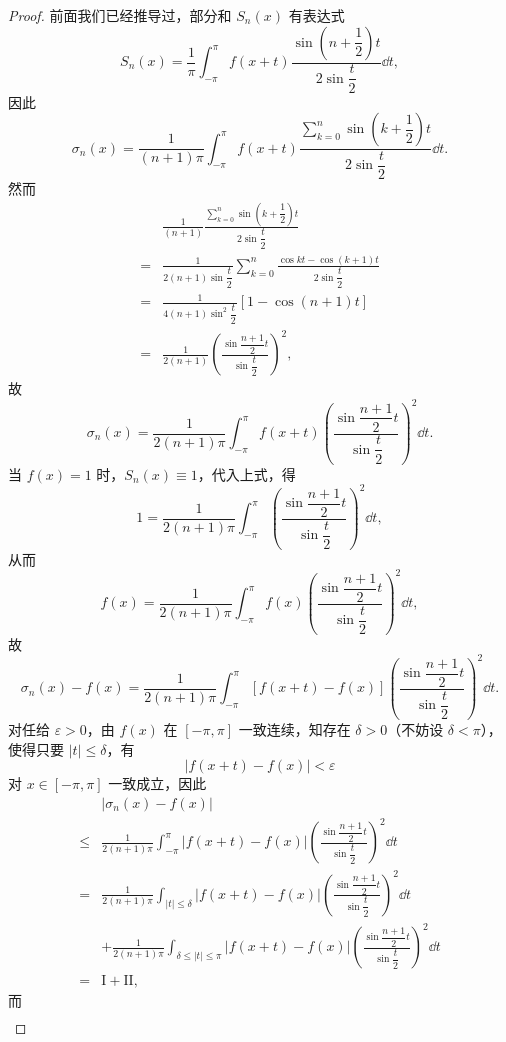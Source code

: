 \begin{proof}
前面我们已经推导过，部分和 $S_{n}(x)$ 有表达式
\[
S_{n}(x)=\frac{1}{\pi}\int_{-\pi}^{\pi}f(x+t)\frac{\sin\left(n+\dfrac{1}{2}\right)t}{2\sin\dfrac{t}{2}}\dd t,
\]
因此
\[
\sigma_{n}(x)=\frac{1}{(n+1)\pi}\int_{-\pi}^{\pi}f(x+t)\frac{\displaystyle\sum_{k=0}^{n}\sin\left(k+\dfrac{1}{2}\right)t}{2\sin\dfrac{t}{2}}\dd t.
\]
然而
\[
\begin{aligned}
&\frac{1}{(n+1)}\frac{\displaystyle\sum_{k=0}^{n}\sin\left(k+\dfrac{1}{2}\right)t}{2\sin\dfrac{t}{2}}\\
={}&\frac{1}{2(n+1)\sin\dfrac{t}{2}}\sum_{k=0}^{n}\frac{\cos kt-\cos(k+1)t}{2\sin\dfrac{t}{2}}\\
={}&\frac{1}{4(n+1)\sin^{2}\dfrac{t}{2}}\left[1-\cos(n+1)t\right]\\
={}&\frac{1}{2(n+1)}\left(\frac{\sin\dfrac{n+1}{2}t}{\sin\dfrac{t}{2}}\right)^{2},
\end{aligned}
\]
故
\[
\sigma_{n}(x)=\frac{1}{2(n+1)\pi}\int_{-\pi}^{\pi}f(x+t)\left(\frac{\sin\dfrac{n+1}{2}t}{\sin\dfrac{t}{2}}\right)^{2}\dd t.
\]
当 $f(x)=1$ 时，$S_{n}(x)\equiv 1$，代入上式，得
\[
1=\frac{1}{2(n+1)\pi}\int_{-\pi}^{\pi}\left(\frac{\sin\dfrac{n+1}{2}t}{\sin\dfrac{t}{2}}\right)^{2}\dd t,
\]
从而
\[
f(x)=\frac{1}{2(n+1)\pi}\int_{-\pi}^{\pi}f(x)\left(\frac{\sin\dfrac{n+1}{2}t}{\sin\dfrac{t}{2}}\right)^{2}\dd t,
\]
故
\[
\sigma_{n}(x)-f(x)=\frac{1}{2(n+1)\pi}\int_{-\pi}^{\pi}\left[f(x+t)-f(x)\right]\left(\frac{\sin\dfrac{n+1}{2}t}{\sin\dfrac{t}{2}}\right)^{2}\dd t.
\]
对任给 $\varepsilon>0$，由 $f(x)$ 在 $[-\pi,\pi]$ 一致连续，知存在 $\delta>0$（不妨设 $\delta<\pi$），使得只要 $\left|t\right|\leqslant\delta$，有
\[
\left|f(x+t)-f(x)\right|<\varepsilon
\]
对 $x\in[-\pi,\pi]$ 一致成立，因此
\[
\begin{aligned}
&\left|\sigma_{n}(x)-f(x)\right|\\
\leqslant{}&\frac{1}{2(n+1)\pi}\int_{-\pi}^{\pi}\left|f(x+t)-f(x)\right|\left(\frac{\sin\dfrac{n+1}{2}t}{\sin\dfrac{t}{2}}\right)^{2}\dd t\\
={}&\frac{1}{2(n+1)\pi}\int_{\left|t\right|\leqslant\delta}\left|f(x+t)-f(x)\right|\left(\frac{\sin\dfrac{n+1}{2}t}{\sin\dfrac{t}{2}}\right)^{2}\dd t\\
&+\frac{1}{2(n+1)\pi}\int_{\delta\leqslant\left|t\right|\leqslant\pi}\left|f(x+t)-f(x)\right|\left(\frac{\sin\dfrac{n+1}{2}t}{\sin\dfrac{t}{2}}\right)^{2}\dd t\\
={}&\mathrm{I}+\mathrm{II},
\end{aligned}
\]
而
\[
\begin{aligned}

\end{aligned}\]
\end{proof}
